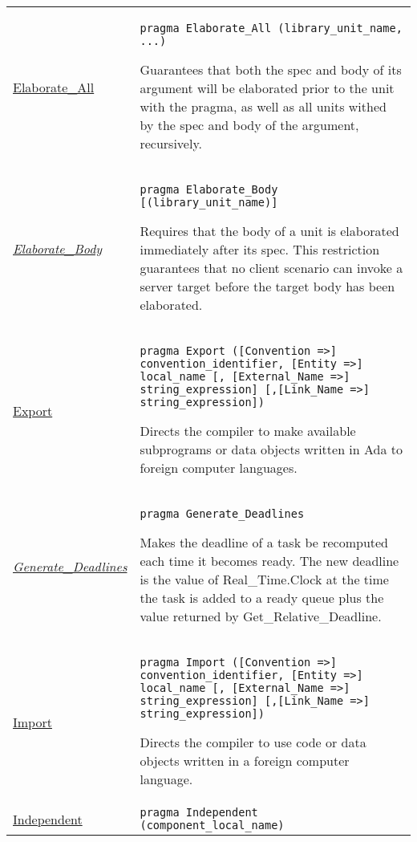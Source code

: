 \documentclass[english]{article}
\begin{document}
\begin{scriptsize}
\begin{multicols*}{3}
\begin{tabular}{@{}p{2cm}p{6.5cm}}
\end{tabular}
\begin{tabular}{@{}p{2cm}p{6.5cm}}

   \href{http://www.ada-auth.org/standards/22rm/html/RM-10-2-1.html}{Elaborate\_All} & \texttt{pragma Elaborate\_All (library\_unit\_name{, ...})}

   Guarantees that both the spec and body of its argument will be elaborated prior to the unit with the pragma, as well as all units withed by the spec and body of the argument, recursively.\\

   \href{http://www.ada-auth.org/standards/22rm/html/RM-J-15-14.html}{\textit{Elaborate\_Body}} & \texttt{pragma Elaborate\_Body [(library\_unit\_name)]}

   Requires that the body of a unit is elaborated immediately after its spec. This restriction guarantees that no client scenario can invoke a server target before the target body has been elaborated.\\

   \href{http://www.ada-auth.org/standards/22rm/html/RM-J-15-5.html}{Export} & \texttt{pragma Export ([Convention =>] convention\_identifier, [Entity =>] local\_name [, [External\_Name =>] string\_expression] [,[Link\_Name =>] string\_expression])}

   Directs the compiler to make available subprograms or data objects written in Ada to foreign computer languages.\\

   \href{http://www.ada-auth.org/standards/22rm/html/RM-D-2-6.html}{\textit{Generate\_Deadlines}} & \texttt{pragma Generate\_Deadlines}

   Makes the deadline of a task be recomputed each time it becomes ready. The new deadline is the value of Real\_Time.Clock at the time the task is added to a ready queue plus the value returned by Get\_Relative\_Deadline.\\

   \href{http://www.ada-auth.org/standards/22rm/html/RM-J-15-5.html}{Import} & \texttt{pragma Import ([Convention =>] convention\_identifier, [Entity =>] local\_name [, [External\_Name =>] string\_expression] [,[Link\_Name =>] string\_expression])}

   Directs the compiler to use code or data objects written in a foreign computer language.\\

   \href{http://www.ada-auth.org/standards/22rm/html/RM-J-15-8.html}{Independent} & \texttt{pragma Independent (component\_local\_name)}


\end{tabular}
\end{multicols*}
\end{scriptsize}
\end{document}
